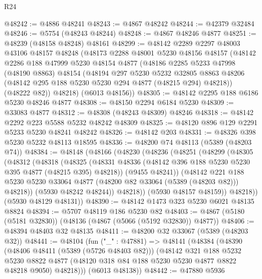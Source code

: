 \begin{lexlean}{R24}
\begin{coremodule}
@48242 := @4886 @48241
@48243 := @4867 @48242
@48244 := @42379 @32484
@48246 := @5754 (@48243 @48244)
@48248 := @4867 @48246 @4877
@48251 := @48239 (@48158 @48248) @48161
@48299 := @48142
    @2289
    @2297
    @48003
    @43106
    @48157
    @48248
    (@48173
      @2288
      @48001
      @5230
      @48156
      @48157
      (@48142
        @2286
        @188
        @47999
        @5230
        @48154
        @4877
        (@48186
          @2285
          @5233
          @47998
          (@48190 @8863)
          @48154
          (@48194
            @297
            @5230
            @5232
            @32805
            @8863
            @48206
            (@48142 @295 @188 @5230 @5230 @294 @4877 (@48215 @294) @48218))
          (@48222 @82))
        @48218)
      (@6013 @48156))
@48305 := @48142 @2295 @188 @6186 @5230 @48246 @4877
@48308 := @48150 @2294 @6184 @5230
@48309 := @33083 @4877
@48312 := @48308 (@48243 @48309) @48246
@48318 := @48142 @2292 @223 @5588 @5232 @48242 @48309
@48325 := @48120 @896 @129 @2291 @5233 @5230 @48241 @48242
@48326 := @48142 @203
@48331 := @48326 @398 @5230 @5232 @48113 @18595
@48336 := @48200 @74 @48113 (@5389 (@48203 @74))
@48384 := @48148
    (@48166
      (@48230
        (@48236
          (@48251
            (@48299
              (@48305
                (@48312
                  (@48318
                    (@48325
                      (@48331 @48336 (@48142 @396 @188 @5230 @5230 @395 @4877 (@48215 @395) @48218))
                      (@9455 @48241))
                    (@48142
                      @221
                      @188
                      @5230
                      @5230
                      @33064
                      @4877
                      (@48200 @82 @33064 (@5389 (@48203 @82)))
                      @48218))
                  (@5930 @48242 @48244))
                @48218))
            (@5930 @48157 @48159))
          @48218))
      (@5930 @48129 @48131))
@48390 := @48142 @1473 @323 @5230 @6021 @48135 @8824
@48394 := @5707 @48119 @186 @5230 @82
@48403 := @4867 (@5180 (@5181 @32830)) (@48136 (@4867 (@5066 (@5192 @32830)) @4877))
@48406 := @48394 @48403 @32 @48135
@48411 := @48200 @32 @33067 (@5389 (@48203 @32))
@48441 := @48104
    (fun ("_" : @47881) =>
    @48141
      (@48384
        (@48390
          (@48406 @48411 (@5389 (@5726 @48403 @82)))
          (@48142
            @321
            @188
            @5232
            @5230
            @8822
            @4877
            (@48120 @318 @84 @188 @5230 @5230 @4877 @8822 @48218 @9050)
            @48218)))
      (@6013 @48138))
@48442 := @47880 @5936

\end{coremodule}
\end{lexlean}
